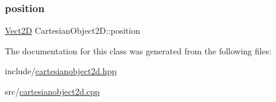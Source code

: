 \subsubsection{\texorpdfstring{position}{position}}
{\footnotesize\ttfamily \hyperlink{classVect2D}{Vect2D} Cartesian\+Object2\+D\+::position\hspace{0.3cm}{\ttfamily [protected]}}



The documentation for this class was generated from the following files\+:\begin{DoxyCompactItemize}
\item 
include/\hyperlink{cartesianobject2d_8hpp}{cartesianobject2d.\+hpp}\item 
src/\hyperlink{cartesianobject2d_8cpp}{cartesianobject2d.\+cpp}\end{DoxyCompactItemize}
